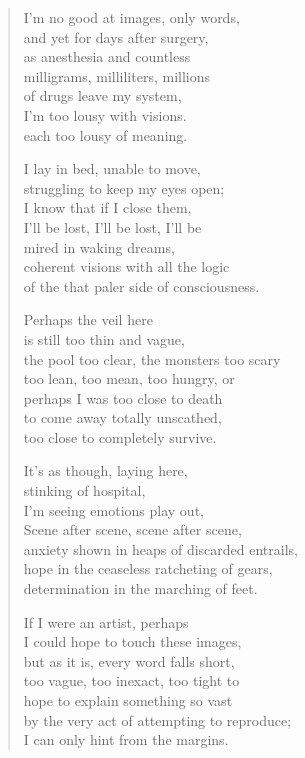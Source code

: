 \begin{verse}
I'm no good at images, only words,\\
and yet for days after surgery,\\
as anesthesia and countless\\
\vin milligrams, milliliters, millions\\
of drugs leave my system,\\
I'm too lousy with visions.\\
each too lousy of meaning.

I lay in bed, unable to move,\\
struggling to keep my eyes open;\\
I know that if I close them,\\
\vin I'll be lost, I'll be lost, I'll be\\
mired in waking dreams,\\
coherent visions with all the logic\\
of the that paler side of consciousness.

Perhaps the veil here\\
is still too thin and vague,\\
the pool too clear, the monsters too scary\\
\vin too lean, too mean, too hungry, or\\
perhaps I was too close to death\\
to come away totally unscathed,\\
too close to completely survive.
\newpage

\vin It's as though, laying here,\\
\vin stinking of hospital,\\
\vin I'm seeing emotions play out,\\
\vin \vin Scene after scene, scene after scene,\\
\vin anxiety shown in heaps of discarded entrails,\\
\vin hope in the ceaseless ratcheting of gears,\\
\vin determination in the marching of feet.

If I were an artist, perhaps\\
I could hope to touch these images,\\
but as it is, every word falls short,\\
\vin too vague, too inexact, too tight to\\
hope to explain something so vast\\
by the very act of attempting to reproduce;\\
I can only hint from the margins.


\end{verse}
